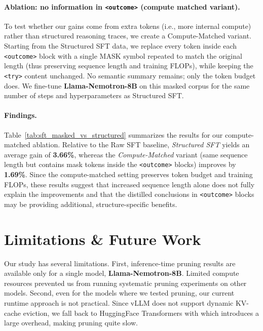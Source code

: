 \documentclass{article}
\begin{document}
\paragraph{Ablation: no information in \texttt{<outcome>} (compute matched variant).}
To test whether our gains come from extra tokens (i.e., more internal compute) rather than structured reasoning traces, we create a Compute-Matched variant. Starting from the Structured SFT data, we replace every token inside each \texttt{<outcome>} block with a single MASK symbol repeated to match the original length (thus preserving sequence length and training FLOPs), while keeping the \texttt{<try>} content unchanged. No semantic summary remains; only the token budget does. We fine-tune \textbf{Llama-Nemotron-8B} on this masked corpus for the same number of steps and hyperparameters as Structured SFT.



\paragraph{Findings.}
Table~\ref{tab:sft_masked_vs_structured} summarizes the results for our compute-matched ablation. Relative to the Raw SFT baseline, \emph{Structured SFT} yields an average gain of \textbf{3.66\%}, whereas the \emph{Compute-Matched} variant (same sequence length but contains mask tokens inside the \texttt{<outcome>} blocks) improves by \textbf{1.69\%}. Since the compute-matched setting preserves token budget and training FLOPs, these results suggest that increased sequence length alone does not fully explain the improvements and that the distilled conclusions in \texttt{<outcome>} blocks may be providing additional, structure-specific benefits.

\section{Limitations \& Future Work}
Our study has several limitations. First, inference-time pruning results are available only for a single model, \textbf{Llama-Nemotron-8B}. Limited compute resources prevented us from running systematic pruning experiments on other models. Second, even for the models where we tested pruning, our current runtime approach is not practical. Since vLLM does not support dynamic KV-cache eviction, we fall back to HuggingFace Transformers with which introduces a large overhead, making pruning quite slow.
\end{document}
